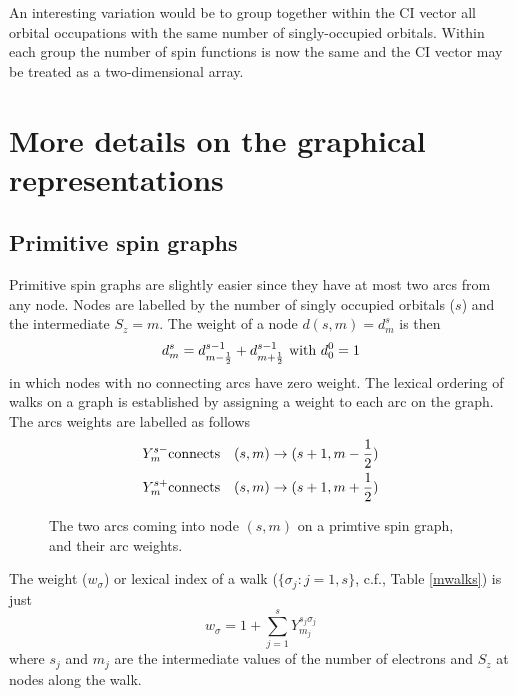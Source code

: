 An interesting variation would be to group together within the CI
vector all orbital occupations with the same number of singly-occupied
orbitals.  Within each group the number of spin functions is now the
same and the CI vector may be treated as a two-dimensional array.

\section{More details on the graphical representations}

\subsection{Primitive spin graphs}

Primitive spin graphs are slightly easier since they have at most two
arcs from any node.  Nodes are labelled by the number of singly
occupied orbitals ($s$) and the intermediate $S_z=m$.  The weight of a
node $d(s,m)=d^s_m$ is then
\begin{equation}
 d^s_m = d^{s-1}_{m-\frac{1}{2}} + d^{s-1}_{m+\frac{1}{2}} \mbox{\ with\ } d^0_0 =
1 \label{spinnodeweight}
\end{equation}
in which nodes with no connecting arcs have zero weight.
The lexical ordering of walks on a graph is established by assigning a
weight to each arc on the graph.  The arcs weights are labelled as
follows
\begin{eqnarray}
 Y^{s-}_m & \mbox{connects} & (s,m) \rightarrow (s+1,m-\frac{1}{2} ) \\
 Y^{s+}_m & \mbox{connects} & (s,m) \rightarrow (s+1,m+\frac{1}{2} )
\end{eqnarray}

\begin{figure}[htbp]

\center

\centerline{}
\caption{\label{spinarcs} The two arcs coming into node $(s,m)$ on a
primtive spin graph, and their arc weights.}
\end{figure}
  
 The weight ($w_{\sigma}$) or lexical index of a walk
($\{\sigma_j:j=1,s\}$, c.f., Table \ref{mwalks}) is just
\begin{equation}
 w_{\sigma} = 1 + \sum_{j=1}^{s} Y_{m_j}^{s_j \sigma_j} \label{spinwalkweight}
\end{equation}
where $s_j$ and $m_j$ are the intermediate values of the number of
electrons and $S_z$ at nodes along the walk. 

